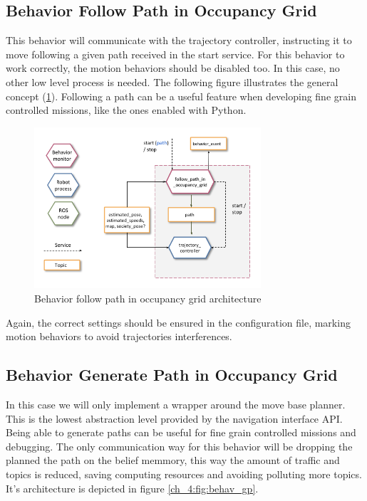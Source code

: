 \subsection{Behavior Follow Path in Occupancy Grid}

  This behavior will communicate with the trajectory controller, instructing it to move following a given path received in the start service. For this behavior to work correctly, the motion behaviors should be disabled too. In this case, no other low level process is needed. The following figure illustrates the general concept (\ref{ch_4:fig:behav_fp}). Following a path can be a useful feature when developing fine grain controlled missions, like the ones enabled with Python.

  \begin{figure}[h]
    \centering
    \includegraphics[width=0.75\textwidth]{./Figures/BehaviorFPArquitecture.png}
    \caption{Behavior follow path in occupancy grid architecture}
    \label{ch_4:fig:behav_fp}
  \end{figure}

  Again, the correct settings should be ensured in the configuration file, marking motion behaviors to avoid trajectories interferences.

\subsection{Behavior Generate Path in Occupancy Grid}

  In this case we will only implement a wrapper around the move base planner. This is the lowest abstraction level provided by the navigation interface API. Being able to generate paths can be useful for fine grain controlled missions and debugging. The only communication way for this behavior will be dropping the planned the path on the belief memmory, this way the amount of traffic and topics is reduced, saving computing resources and avoiding polluting more topics. It's architecture is depicted in figure \ref{ch_4:fig:behav_gp}.

